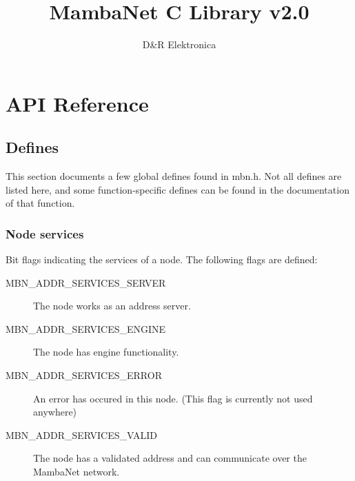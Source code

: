 \documentclass[a4paper]{report}
\begin{document}
\title{MambaNet C Library v2.0}
\author{D\&R Elektronica}
\maketitle

\setcounter{tocdepth}{1}
\tableofcontents
\setcounter{tocdepth}{2}


\chapter{API Reference}
\section{Defines}
This section documents a few global defines found in mbn.h. Not all defines are listed here, and some function-specific defines can be found in the documentation of that function.


\subsection{Node services}
Bit flags indicating the services of a node. The following flags are defined:
\begin{description}
 \item[MBN\_ADDR\_SERVICES\_SERVER]
  The node works as an address server.
 \item[MBN\_ADDR\_SERVICES\_ENGINE]
  The node has engine functionality.
 \item[MBN\_ADDR\_SERVICES\_ERROR]
  An error has occured in this node. (This flag is currently not used anywhere)
 \item[MBN\_ADDR\_SERVICES\_VALID]
  The node has a validated address and can communicate over the MambaNet network.
\end{description}
\end{document}
